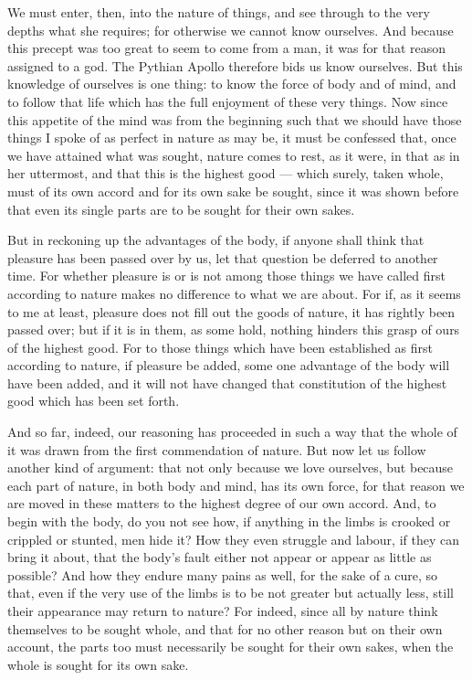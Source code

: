  We must enter, then, into the nature of things, and see through to the very depths what she requires; for otherwise we cannot know ourselves. And because this precept was too great to seem to come from a man, it was for that reason assigned to a god. The Pythian Apollo therefore bids us know ourselves. But this knowledge of ourselves is one thing: to know the force of body and of mind, and to follow that life which has the full enjoyment of these very things. Now since this appetite of the mind was from the beginning such that we should have those things I spoke of as perfect in nature as may be, it must be confessed that, once we have attained what was sought, nature comes to rest, as it were, in that as in her uttermost, and that this is the highest good — which surely, taken whole, must of its own accord and for its own sake be sought, since it was shown before that even its single parts are to be sought for their own sakes.

 But in reckoning up the advantages of the body, if anyone shall think that pleasure has been passed over by us, let that question be deferred to another time. For whether pleasure is or is not among those things we have called first according to nature makes no difference to what we are about. For if, as it seems to me at least, pleasure does not fill out the goods of nature, it has rightly been passed over; but if it is in them, as some hold, nothing hinders this grasp of ours of the highest good. For to those things which have been established as first according to nature, if pleasure be added, some one advantage of the body will have been added, and it will not have changed that constitution of the highest good which has been set forth.

 And so far, indeed, our reasoning has proceeded in such a way that the whole of it was drawn from the first commendation of nature. But now let us follow another kind of argument: that not only because we love ourselves, but because each part of nature, in both body and mind, has its own force, for that reason we are moved in these matters to the highest degree of our own accord. And, to begin with the body, do you not see how, if anything in the limbs is crooked or crippled or stunted, men hide it? How they even struggle and labour, if they can bring it about, that the body's fault either not appear or appear as little as possible? And how they endure many pains as well, for the sake of a cure, so that, even if the very use of the limbs is to be not greater but actually less, still their appearance may return to nature? For indeed, since all by nature think themselves to be sought whole, and that for no other reason but on their own account, the parts too must necessarily be sought for their own sakes, when the whole is sought for its own sake.

